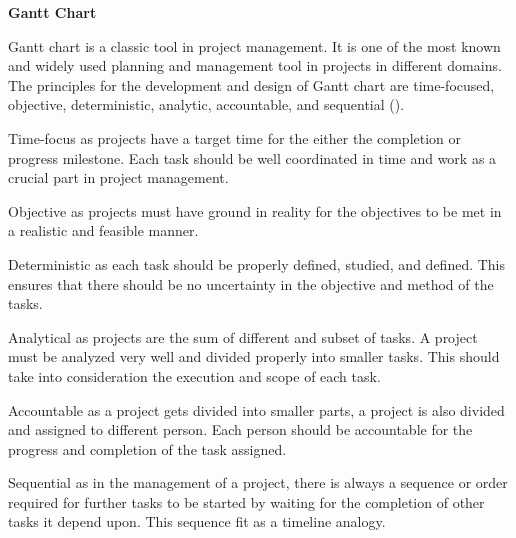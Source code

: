 \flushleft
\textbf{Gantt Chart}\\
\justifying

\parx
Gantt chart is a classic tool in project management. It is one of the most known and
widely used planning and management tool in projects in different domains. The
principles for the development and design of Gantt chart are time-focused, objective,
deterministic, analytic, accountable, and sequential
(\cite{geraldi_lechter_2012}).

\parx
Time-focus as projects have a target time for the either the completion or progress
milestone. Each task should be well coordinated in time and work as a crucial part in
project management.

\parx
Objective as projects must have ground in reality for the objectives to be met in a
realistic and feasible manner.

\parx
Deterministic as each task should be properly defined, studied, and defined. This
ensures that there should be no uncertainty in the objective and method of the tasks.

\parx
Analytical as projects are the sum of different and subset of tasks. A project must
be analyzed very well and divided properly into smaller tasks. This should take into
consideration the execution and scope of each task.

\parx
Accountable as a project gets divided into smaller parts, a project is also divided
and assigned to different person. Each person should be accountable for the progress
and completion of the task assigned.

\parx
Sequential as in the management of a project, there is always a sequence or order
required for further tasks to be started by waiting for the completion of other tasks
it depend upon. This sequence fit as a timeline analogy.
